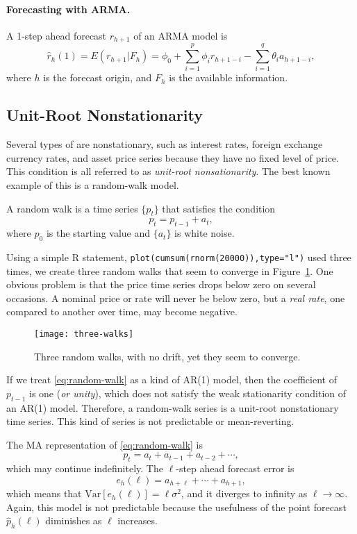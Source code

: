 \paragraph{Forecasting with ARMA.} A 1-step ahead forecast $r_{h+1}$ of an ARMA model is
\[
\hat{r}_h(1)=E(r_{h+1}|F_h)=\phi_0 + \sum^p_{i=1} \phi_i r_{h+1-i} - \sum^q_{i=1} \theta_i a_{h+1-i},
\]
where $h$ is the forecast origin, and $F_h$ is the available information.

\subsection{Unit-Root Nonstationarity}
Several types of \fts{} are nonstationary, such as interest rates, foreign exchange currency rates, and asset price series because they have no fixed level of price. This condition is all referred to as \emph{unit-root nonsationarity}.  The best known example of this is a random-walk model.

A random walk is a time series $\{p_t\}$ that satisfies the condition
\begin{equation}
p_t = p_{t-1}+a_t,
\label{eq:random-walk}
\end{equation}
where $p_0$ is the starting value and $\{a_t\}$ is white noise.

Using a simple R statement, \texttt{plot(cumsum(rnorm(20000)),type="l")} used three times, we create three random walks that seem to converge in Figure~\ref{figure:three-walks}. One obvious problem is that the price time series drops below zero on several occasions. A nominal price or rate will never be below zero, but a \emph{real rate}, one compared to another over time, may become negative.
\begin{figure}[tb]
  \centering
  \texttt{[image: three-walks]}
  \caption[Three Random Walks, no Drift]{Three random walks, with no drift, yet they seem to converge.}
  \label{figure:three-walks}
\end{figure}

If we treat \eqref{eq:random-walk} as a kind of AR(1) model, then the coefficient of $p_{t-1}$ is one (\emph{or unity}), which does not satisfy the weak stationarity condition of an AR(1) model. Therefore, a random-walk series is a unit-root nonstationary time series.  This kind of series is not predictable or mean-reverting.

The MA representation of \eqref{eq:random-walk} is
\[
p_t = a_t + a_{t-1} + a_{t-2} + \cdots,
\]
which may continue indefinitely. The $\ell$-step ahead forecast error is
\[
e_h(\ell) = a_{h+\ell} + \cdots + a_{h+1},
\]
which means that $\text{Var}[e_h(\ell)] = \ell \sigma^2$, and it diverges to infinity as $\ell \to \infty$. Again, this model is not predictable because the usefulness of the point forecast $\hat{p}_h(\ell)$ diminishes as $\ell$ increases.

